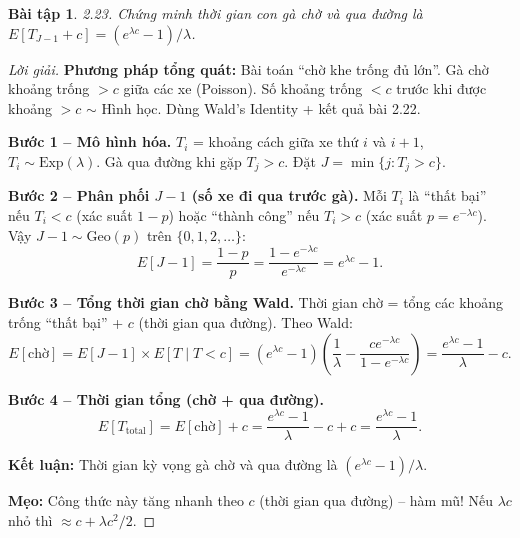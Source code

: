 \documentclass[8pt,a4paper]{article}
\newtheorem{exercise}{Bài tập}
\newenvironment{solution}{\begin{proof}[Lời giải]}{\end{proof}}
\begin{document}
\begin{exercise}
2.23. Chứng minh thời gian con gà chờ và qua đường là $E[T_{J-1} + c] = (e^{\lambda c} - 1)/\lambda$.
\end{exercise}
\begin{solution}
\textbf{Phương pháp tổng quát:} Bài toán ``chờ khe trống đủ lớn''. Gà chờ khoảng trống $> c$ giữa các xe (Poisson). Số khoảng trống $< c$ trước khi được khoảng $> c$ $\sim$ Hình học. Dùng Wald's Identity + kết quả bài 2.22.

\textbf{Bước 1 -- Mô hình hóa.} $T_i$ = khoảng cách giữa xe thứ $i$ và $i+1$, $T_i \sim \text{Exp}(\lambda)$. Gà qua đường khi gặp $T_j > c$. Đặt $J = \min\{j : T_j > c\}$.

\textbf{Bước 2 -- Phân phối $J-1$ (số xe đi qua trước gà).} Mỗi $T_i$ là ``thất bại'' nếu $T_i < c$ (xác suất $1-p$) hoặc ``thành công'' nếu $T_i > c$ (xác suất $p = e^{-\lambda c}$). Vậy $J-1 \sim \text{Geo}(p)$ trên $\{0,1,2,\ldots\}$:
\[
  E[J-1] = \frac{1-p}{p} = \frac{1-e^{-\lambda c}}{e^{-\lambda c}} = e^{\lambda c} - 1.
\]

\textbf{Bước 3 -- Tổng thời gian chờ bằng Wald.} Thời gian chờ = tổng các khoảng trống ``thất bại'' + $c$ (thời gian qua đường). Theo Wald:
\[
  E[\text{chờ}] = E[J-1] \times E[T \mid T < c] = (e^{\lambda c}-1)\left(\frac{1}{\lambda} - \frac{ce^{-\lambda c}}{1-e^{-\lambda c}}\right) = \frac{e^{\lambda c}-1}{\lambda} - c.
\]

\textbf{Bước 4 -- Thời gian tổng (chờ + qua đường).}
\[
  E[T_{\text{total}}] = E[\text{chờ}] + c = \frac{e^{\lambda c}-1}{\lambda} - c + c = \boxed{\frac{e^{\lambda c} - 1}{\lambda}}.
\]

\textbf{Kết luận:} Thời gian kỳ vọng gà chờ và qua đường là $(e^{\lambda c}-1)/\lambda$.

\textbf{Mẹo:} Công thức này tăng nhanh theo $c$ (thời gian qua đường) -- hàm mũ! Nếu $\lambda c$ nhỏ thì $\approx c + \lambda c^2/2$.
\end{solution}
\end{document}
